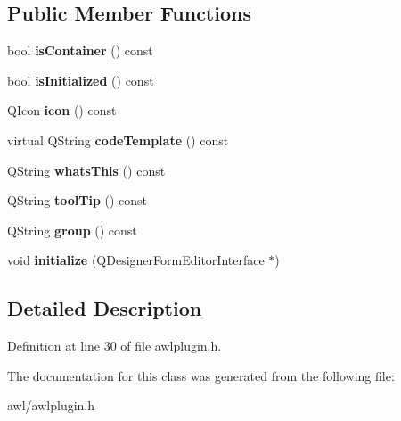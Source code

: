 \subsection*{Public Member Functions}
\begin{DoxyCompactItemize}
\item 
\mbox{\label{class_awl_plugin_a351f5335c5148ae5665aa4882f27405a}} 
bool {\bfseries is\+Container} () const
\item 
\mbox{\label{class_awl_plugin_a54fb286f31f3e82b43b85f1ee61c8e3c}} 
bool {\bfseries is\+Initialized} () const
\item 
\mbox{\label{class_awl_plugin_a4f1bd49f82430ad47010cb7bedd62fcf}} 
Q\+Icon {\bfseries icon} () const
\item 
\mbox{\label{class_awl_plugin_ac06545239285014bfa98aa25135b34ab}} 
virtual Q\+String {\bfseries code\+Template} () const
\item 
\mbox{\label{class_awl_plugin_a6a223d78a350dafc413c82bbf1fbea25}} 
Q\+String {\bfseries whats\+This} () const
\item 
\mbox{\label{class_awl_plugin_aa8480aa8aceb1199f0b7959405f74beb}} 
Q\+String {\bfseries tool\+Tip} () const
\item 
\mbox{\label{class_awl_plugin_a8b65811522296b994ef470fb8526c768}} 
Q\+String {\bfseries group} () const
\item 
\mbox{\label{class_awl_plugin_a5c83605160e8cf7c7a245664ed602f8c}} 
void {\bfseries initialize} (Q\+Designer\+Form\+Editor\+Interface $\ast$)
\end{DoxyCompactItemize}


\subsection{Detailed Description}


Definition at line 30 of file awlplugin.\+h.



The documentation for this class was generated from the following file\+:\begin{DoxyCompactItemize}
\item 
awl/awlplugin.\+h\end{DoxyCompactItemize}
